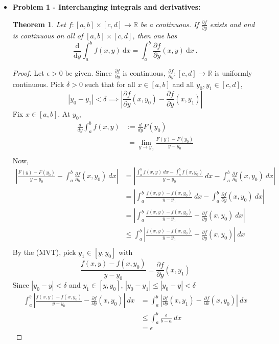 \documentclass[12pt, reqno]{amsart}
\newtheorem*{theorem*}{Theorem}          %
\theoremstyle{definition}
\theoremstyle{remark}
\newcommand{\ud}{\mathrm{d}}
\begin{document}
\begin{itemize}

\item {\bf{Problem 1 - Interchanging integrals and derivatives:}}

\vspace{0.1 cm}
\begin{theorem*}
Let $f: [a,b] \times [c,d] \to \mathbb{R}$ be a continuous. If $\frac{\partial f}{ \partial y}$ exists and and is continuous on all of $[a,b] \times [c,d]$, then one has
\begin{equation*}
\dfrac{\ud}{\ud y} \int_a^b f(x,y) ~\ud x = \int_a^b \frac{\partial f}{\partial y}(x,y) ~\ud x ~\mbox{.}
\end{equation*}
\end{theorem*}

\begin{proof}
   
   Let $\epsilon>0$ be given. Since $\frac{\partial f}{\partial y}$ is continuous, $\frac{\partial f}{\partial y}:[c,d]\rightarrow \mathbb{R}$ is uniformly continuous. Pick $\delta>0$ such that for all $x\in[a,b]$ and all $y_{0},y_{1}\in[c,d]$, $$|y_{0}-y_{1}|<\delta\implies \left|\frac{\partial f}{\partial y}(x,y_{0})- \frac{\partial f}{\partial y}(x,y_{1})\right|$$Fix $x\in[a,b]$. At $y_{0}$,
   \begin{align*}
   \frac{d}{dy}\int_{a}^{b}f(x,y)&:=  \frac{d}{dy}F(y_{0})\\
   &\ = \lim_{y\rightarrow y_{0}}\frac{F(y)-F(y_{0})}{y-y_{0}}\\
   \end{align*}
   Now,
   \begin{align*}
   \left|\frac{F(y)-F(y_{0})}{y-y_{0}}-\int_{a}^{b} \frac{\partial  f}{\partial y}(x,y_{0})\ dx\right|&= \left|\frac{\int_{a}^{b}f(x,y)\ dx-\int_{a}^{b}f(x,y_{0})}{y-y_{0}}\ dx-\int_{a}^{b} \frac{\partial  f}{\partial y}(x,y_{0})\ dx\right|\\
   &= \left|\int_{a}^{b}\frac{f(x,y)-f(x,y_{0})}{y-y_{0}}\ dx-\int_{a}^{b} \frac{\partial  f}{\partial y}(x,y_{0})\ dx\right|\\
   &= \left|\int_{a}^{b} \frac{f(x,y)-f(x,y_{0})}{y-y_{0}}-\frac{\partial  f}{\partial y}(x,y_{0})\ dx\right|\\
   &\le\int_{a}^{b}\left|\frac{f(x,y)-f(x,y_{0})}{y-y_{0}}- \frac{\partial  f}{\partial y}(x,y_{0})\right|\ dx\\
   \end{align*}
   By the (MVT), pick $y_{1}\in[y,y_{0}]$ with $$\frac{f(x,y)-f(x,y_{0})}{y-y_{0}}= \frac{\partial f}{\partial y}(x,y_{1})$$Since $|y_{0}-y|<\delta$ and $y_{1}\in[y,y_{0}]$, $|y_{0}-y_{1}|\le|y_{0}-y|<\delta$ \begin{align*}
   \int_{a}^{b}\left|\frac{f(x,y)-f(x,y_{0})}{y-y_{0}}- \frac{\partial  f}{\partial y}(x,y_{0})\right|\ dx&= \int_{a}^{b} \left|\frac{\partial f}{\partial y}(x,y_{1})-\frac{\partial f}{\partial x}(x,y_{0})\right|\ dx\\
   &\le \int_{a}^{b} \frac{\epsilon}{b-a}\ dx\\
   &= \epsilon
   \end{align*}
   

\end{proof}
\end{itemize}
\end{document}

